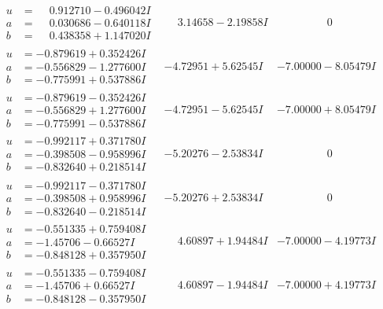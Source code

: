 \documentclass[1p]{elsarticle_modified}
\theoremstyle{definition}
\begin{document}
$$\begin{array}{c|c|c}
 \hline 
\begin{aligned}
u &= \phantom{-}0.912710 - 0.496042 I \\
a &= \phantom{-}0.030686 - 0.640118 I \\
b &= \phantom{-}0.438358 + 1.147020 I\end{aligned}
 & \phantom{-}3.14658 - 2.19858 I & \phantom{-0.000000 } 0 \\ \hline\begin{aligned}
u &= -0.879619 + 0.352426 I \\
a &= -0.556829 - 1.277600 I \\
b &= -0.775991 + 0.537886 I\end{aligned}
 & -4.72951 + 5.62545 I & -7.00000 - 8.05479 I \\ \hline\begin{aligned}
u &= -0.879619 - 0.352426 I \\
a &= -0.556829 + 1.277600 I \\
b &= -0.775991 - 0.537886 I\end{aligned}
 & -4.72951 - 5.62545 I & -7.00000 + 8.05479 I \\ \hline\begin{aligned}
u &= -0.992117 + 0.371780 I \\
a &= -0.398508 - 0.958996 I \\
b &= -0.832640 + 0.218514 I\end{aligned}
 & -5.20276 - 2.53834 I & \phantom{-0.000000 } 0 \\ \hline\begin{aligned}
u &= -0.992117 - 0.371780 I \\
a &= -0.398508 + 0.958996 I \\
b &= -0.832640 - 0.218514 I\end{aligned}
 & -5.20276 + 2.53834 I & \phantom{-0.000000 } 0 \\ \hline\begin{aligned}
u &= -0.551335 + 0.759408 I \\
a &= -1.45706 - 0.66527 I \\
b &= -0.848128 + 0.357950 I\end{aligned}
 & \phantom{-}4.60897 + 1.94484 I & -7.00000 - 4.19773 I \\ \hline\begin{aligned}
u &= -0.551335 - 0.759408 I \\
a &= -1.45706 + 0.66527 I \\
b &= -0.848128 - 0.357950 I\end{aligned}
 & \phantom{-}4.60897 - 1.94484 I & -7.00000 + 4.19773 I \\ \hline\begin{aligned}

\end{aligned}
\end{array}$$
\end{document}
